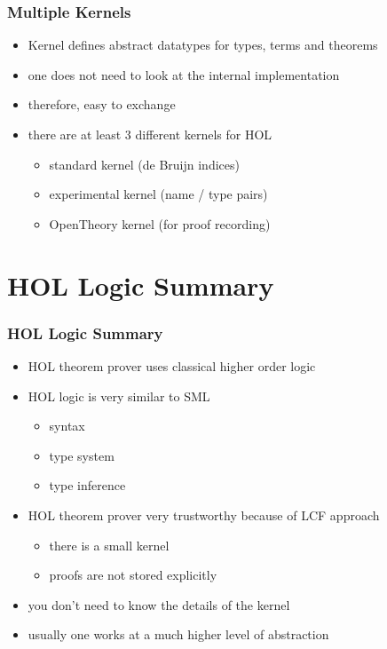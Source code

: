 \begin{frame}
\frametitle{Multiple Kernels}
\begin{itemize}
\item Kernel defines abstract datatypes for types, terms and theorems
\item one does not need to look at the internal implementation
\item therefore, easy to exchange
\item there are at least 3 different kernels for HOL
\begin{itemize}
\item standard kernel (de Bruijn indices)
\item experimental kernel (name / type pairs)
\item OpenTheory kernel (for proof recording) 
\end{itemize}
\end{itemize}
\end{frame}


\section{HOL Logic Summary}

\begin{frame}
\frametitle{HOL Logic Summary}
\begin{itemize}
\item HOL theorem prover uses classical higher order logic
\item HOL logic is very similar to SML
\begin{itemize}
\item syntax 
\item type system 
\item type inference
\end{itemize}
\item HOL theorem prover very trustworthy because of LCF approach
\begin{itemize}
\item there is a small kernel
\item proofs are not stored explicitly
\end{itemize}
\item you don't need to know the details of the kernel
\item usually one works at a much higher level of abstraction
\end{itemize}
\end{frame}

